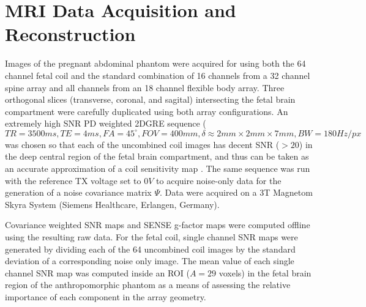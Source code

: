 \section{MRI Data Acquisition and Reconstruction}
Images of the pregnant abdominal phantom were acquired for using both the 64 channel fetal coil and the standard
combination of 16 channels from a 32 channel spine array and all channels from an 18 channel flexible body array. Three
orthogonal slices (transverse, coronal, and sagital) intersecting the fetal brain compartment were carefully duplicated
using both array configurations. An extremely high SNR PD weighted 2DGRE sequence ($TR=3500ms, TE=4ms, FA=45^{\circ},
FOV=400mm, \delta \approx 2mm \times 2mm \times 7mm, BW=180Hz/px$ was chosen so that each of the uncombined coil images
has decent SNR ($>20$) in the deep central region of the fetal brain compartment, and thus can be taken as an accurate
approximation of a coil sensitivity map \cite{Roemer90}. The same sequence was run with the reference TX voltage set to
$0V$ to acquire noise-only data for the generation of a noise covariance matrix $\Psi$. Data were acquired on a 3T
Magnetom Skyra System (Siemens Healthcare, Erlangen, Germany).

Covariance weighted SNR maps and SENSE g-factor maps were computed offline using the resulting raw data. For the fetal
coil, single channel SNR maps were generated by dividing each of the 64 uncombined coil images by the standard deviation
of a corresponding noise only image. The mean value of each single channel SNR map was computed inside an ROI ($A=29$
voxels) in the fetal brain region of the anthropomorphic phantom as a means of assessing the relative importance of each
component in the array geometry.


